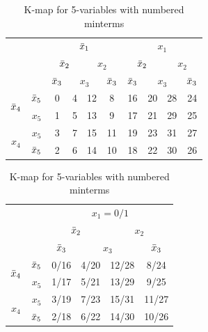 \begin{table}
  \begin{tabular}{c|c|c|c|c|c|c|c|c|c}
  \toprule
  && \multicolumn{4}{c|}{$\bar{x}_1$} & \multicolumn{4}{c}{$x_1$}
    \\
    && \multicolumn{2}{c|}{$\bar{x}_2$} & \multicolumn{2}{c|}{$x_2$}
               & \multicolumn{2}{c|}{$\bar{x}_2$} & \multicolumn{2}{c}{$x_2$}
  \\
  && $\bar{x}_3$ & \multicolumn{2}{c|}{$x_3$} & $\bar{x}_3$
              & $\bar{x}_3$ & \multicolumn{2}{c|}{$x_3$} & $\bar{x}_3$
  \\ \midrule
  \multirow{2}{*}{$\bar{x}_4$} & $\bar{x}_5$
                                  & 0 & 4 & 12 & 8
                                              & 16 & 20 &  28 & 24
  \\
  & $x_5$
                                  & 1 & 5 & 13 & 9
                                              & 17 & 21 &  29 & 25
  \\
  \multirow{2}{*}{$x_4$}   &  $x_5$
                                  & 3 & 7 & 15 & 11
                                              & 19 & 23 &  31 & 27
  \\
  & $\bar{x}_5$
                                  & 2 & 6 & 14 & 10
                                              & 18 & 22 &  30 & 26
  \\\bottomrule
\end{tabular}

\hfill

\begin{tabular}{c|c|cccc}
  \toprule
  && \multicolumn{4}{c}{$x_1 = 0/1$}
  \\
  && \multicolumn{2}{c|}{$\bar{x}_2$} & \multicolumn{2}{c}{$x_2$}
                                    
  \\
  && $\bar{x}_3$ & \multicolumn{2}{|c|}{$x_3$} & $\bar{x}_3$
  \\ \midrule
  \multirow{2}{*}{$\bar{x}_4$} & $\bar{x}_5$
  &
    0/16 & 4/20 &  12/28 & 8/24
  \\
  & $x_5$
  &
    1/17 & 5/21  & 13/29 & 9/25
  \\
  \multirow{2}{*}{$x_4$}   &  $x_5$
  &
    3/19 & 7/23 &  15/31 & 11/27
  \\
  & $\bar{x}_5$
  &
    2/18 & 6/22 & 14/30 & 10/26
  \\\bottomrule
\end{tabular}
\caption{K-map for 5-variables with numbered minterms}
\end{table}
